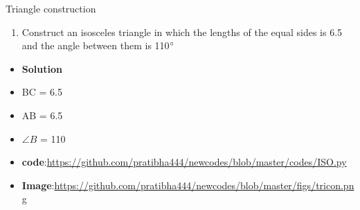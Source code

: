 \begin{frame}{Triangle construction}
\begin{enumerate}
\conti
\item Construct an isosceles triangle in which the lengths of the equal sides is 6.5 and the angle between them is 110$\degree$
\seti
\end{enumerate}
\begin{itemize}
\item\textbf{Solution}\\

\item BC = 6.5\\
\item AB = 6.5\\
\item $\angle B$ = 110\\ 
\item\textbf{code}:\url{https://github.com/pratibha444/newcodes/blob/master/codes/ISO.py}
\item\textbf{Image}:\url{https://github.com/pratibha444/newcodes/blob/master/figs/tricon.png}
\end{itemize}
\end{frame}
